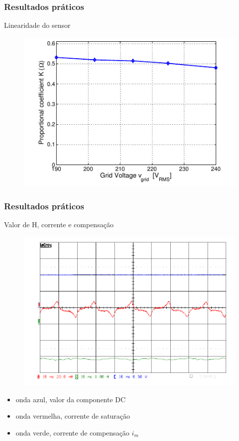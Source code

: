 \documentclass{beamer}
\begin{document}
\begin{frame}
    \frametitle{Resultados práticos}

    Linearidade do sensor
    \begin{figure}
        \includegraphics[width=.8\linewidth]{fig15.png}
    \end{figure}
\end{frame}

\begin{frame}
    \frametitle{Resultados práticos}

    Valor de H, corrente e compensação
    \begin{figure}
        \includegraphics[width=.7\linewidth]{fig17.png}
    \end{figure}
    \begin{itemize} 
        \item onda azul, valor da componente DC
        \item onda vermelha, corrente de saturação
        \item onda verde, corrente de compensação $i_m$
    \end{itemize}
\end{frame}
\end{document}
